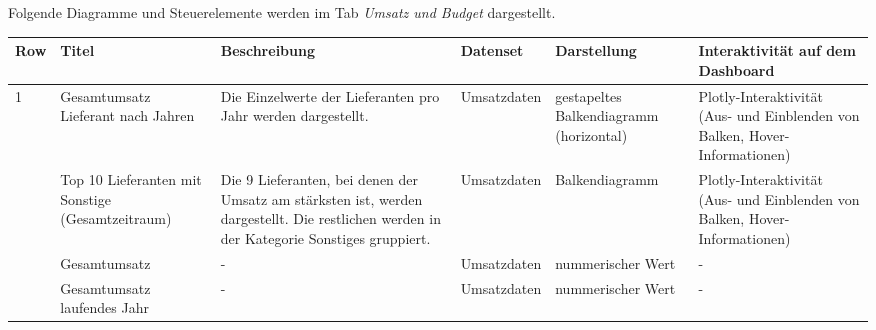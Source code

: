     \clearpage
    Folgende Diagramme und Steuerelemente werden im Tab \textit{Umsatz und Budget} dargestellt.
    \begingroup
    \setlength{\tabcolsep}{12pt} %
    \begin{table}[H]
        \Large
        \centering
        \begin{adjustbox}{max width=\textwidth}
        \begin{tabular}{p{}p{}p{}p{}p{}p{}}
           \toprule
           Row        &Titel &Beschreibung &Datenset &Darstellung &Interaktivität auf dem Dashboard\\
           \midrule
            1           &Gesamtumsatz Lieferant nach Jahren &Die Einzelwerte der Lieferanten pro Jahr werden dargestellt.   &Umsatzdaten    &gestapeltes Balkendiagramm (horizontal)    &Plotly-Interaktivität (Aus- und Einblenden von Balken, Hover-Informationen)\\
                        &Top 10 Lieferanten mit Sonstige (Gesamtzeitraum)   &Die 9 Lieferanten, bei denen der Umsatz am stärksten ist, werden dargestellt. Die restlichen werden in der Kategorie Sonstiges gruppiert.   &Umsatzdaten    &Balkendiagramm    &Plotly-Interaktivität (Aus- und Einblenden von Balken, Hover-Informationen)\\
                        &Gesamtumsatz&-&Umsatzdaten    &nummerischer Wert   &-\\
                        &Gesamtumsatz laufendes Jahr&-&Umsatzdaten    &nummerischer Wert   &-\\
            

\end{tabular}
\end{adjustbox}
\end{table}
